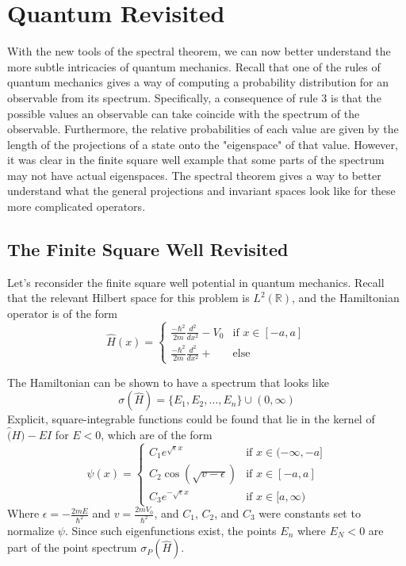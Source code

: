 \section{Quantum Revisited}
With the new tools of the spectral theorem, we can now better understand the
more subtle intricacies of quantum mechanics. Recall that one of the rules of
quantum mechanics gives a way of computing a probability distribution for an
observable from its spectrum. Specifically, a consequence of rule 3 is that the
possible values an observable can take coincide with the spectrum of the
observable. Furthermore, the relative probabilities of each value are given by
the length of the projections of a state onto the "eigenspace" of that value.
However, it was clear in the finite square well example that some parts of the
spectrum may not have actual eigenspaces. The spectral theorem gives a way to
better understand what the general projections and invariant spaces look like
for these more complicated operators.

\subsection{The Finite Square Well Revisited}
Let's reconsider the finite square well potential in quantum mechanics. Recall
that the relevant Hilbert space for this problem is $L^2(\mathbb{R})$, and the
Hamiltonian operator is of the form
\[
    \hat{H}(x) =
    \begin{cases}
        \frac{-\hbar^2}{2m}\frac{d^2}{dx^2} - V_0& \text{if } x\in[-a,a]\\
        \frac{-\hbar^2}{2m}\frac{d^2}{dx^2} + &\text{else}
    \end{cases}
\]

The Hamiltonian can be shown to have a spectrum that looks like
\[
    \sigma(\hat{H}) = \{E_1, E_2,\hdots,E_n\} \cup (0,\infty)
\]
Explicit, square-integrable functions could be found that lie in the kernel of
$\hat(H) - EI$ for $E < 0$, which are of the form
\[
    \psi(x) =
    \begin{cases}
        C_1e^{\sqrt{\epsilon}x}& \text{if } x\in(-\infty,-a]\\
        C_2\cos(\sqrt{v-\epsilon})& \text{if } x\in[-a,a]\\
        C_3e^{-\sqrt{\epsilon}x}& \text{if } x\in [a, \infty)
    \end{cases}
\]
Where $\epsilon = -\frac{2mE}{\hbar^2}$ and $v=\frac{2mV_0}{\hbar^2}$, and
$C_1$, $C_2$, and $C_3$ were constants set to normalize $\psi$. Since such
eigenfunctions exist, the points $E_n$ where $E_N<0$ are part of the point
spectrum $\sigma_P(\hat{H})$.

